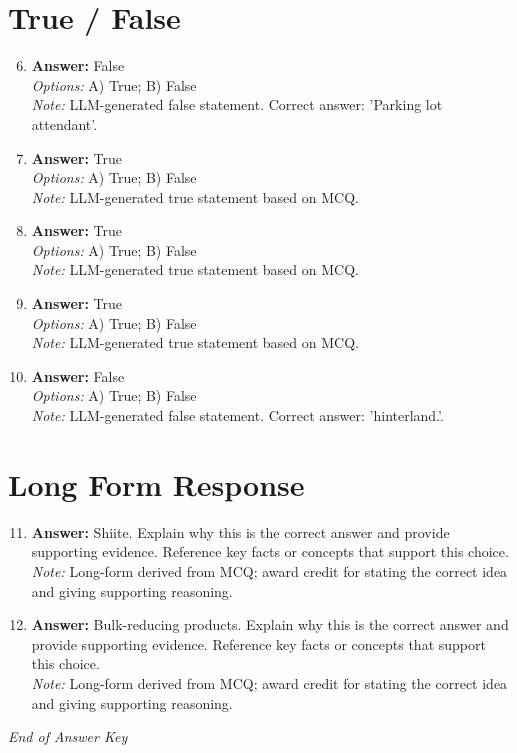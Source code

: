 \documentclass[12pt]{article}
\begin{document}
\section*{True / False}
\begin{enumerate}[label=\arabic*.]
\setcounter{enumi}{5}
\item \textbf{Answer:} False
\\ \textit{Options:} A) True; B) False
\\ \textit{Note:} LLM-generated false statement. Correct answer: 'Parking lot attendant'.
\item \textbf{Answer:} True
\\ \textit{Options:} A) True; B) False
\\ \textit{Note:} LLM-generated true statement based on MCQ.
\item \textbf{Answer:} True
\\ \textit{Options:} A) True; B) False
\\ \textit{Note:} LLM-generated true statement based on MCQ.
\item \textbf{Answer:} True
\\ \textit{Options:} A) True; B) False
\\ \textit{Note:} LLM-generated true statement based on MCQ.
\item \textbf{Answer:} False
\\ \textit{Options:} A) True; B) False
\\ \textit{Note:} LLM-generated false statement. Correct answer: 'hinterland.'.
\end{enumerate}

\section*{Long Form Response}
\begin{enumerate}[label=\arabic*.]
\setcounter{enumi}{10}
\item \textbf{Answer:} Shiite. Explain why this is the correct answer and provide supporting evidence. Reference key facts or concepts that support this choice.
\\ \textit{Note:} Long-form derived from MCQ; award credit for stating the correct idea and giving supporting reasoning.
\item \textbf{Answer:} Bulk-reducing products. Explain why this is the correct answer and provide supporting evidence. Reference key facts or concepts that support this choice.
\\ \textit{Note:} Long-form derived from MCQ; award credit for stating the correct idea and giving supporting reasoning.
\end{enumerate}

\vfill
\noindent\textit{End of Answer Key}
\end{document}
